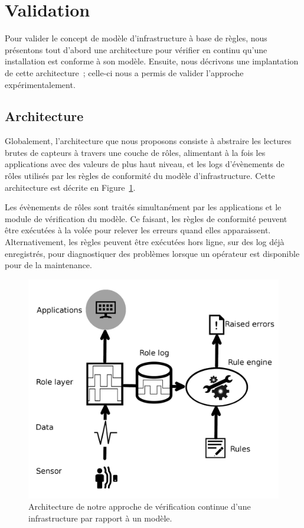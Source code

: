 \section{Validation}\label{seq:fiabilite:validation}

Pour valider le concept de modèle d'infrastructure à base de règles,
nous présentons tout d'abord une architecture pour vérifier en continu qu'une installation 
est conforme à son modèle. Ensuite, nous décrivons une implantation de
cette architecture~; celle-ci nous a permis de valider l'approche expérimentalement.

\subsection{Architecture}
Globalement, l'architecture que nous proposons consiste à abstraire les lectures brutes de 
capteurs à travers une couche de rôles, alimentant à la fois les applications 
avec des valeurs de plus haut niveau, et les logs d'évènements de rôles utilisés par les 
règles de conformité du modèle d'infrastructure. Cette architecture est décrite 
en Figure~\ref{fig:archi}.

Les évènements de rôles sont traités simultanément par les applications et le 
module de vérification du modèle. Ce faisant, les règles de conformité peuvent être exécutées à la 
volée pour relever les erreurs quand elles apparaissent. Alternativement, les 
règles peuvent être exécutées hors ligne, sur des log déjà enregistrés, pour diagnostiquer des problèmes lorsque 
un opérateur est disponible pour de la maintenance.

\begin{figure}[!h]
  \centering
  \includegraphics[width=\linewidth,totalheight=\textheight,keepaspectratio]{gfx/architecture.png}
  \caption{Architecture de notre approche de vérification continue d'une infrastructure par rapport à un modèle.}
  \label{fig:archi}
\end{figure}


